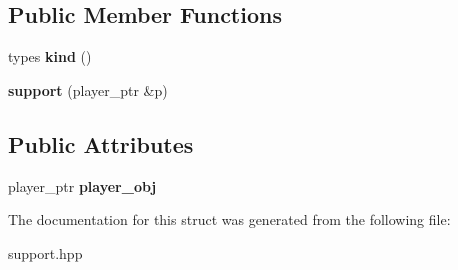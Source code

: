 \subsection*{Public Member Functions}
\begin{DoxyCompactItemize}
\item 
\mbox{\label{structmods_1_1classes_1_1support_a4921613c11bb1c34e6cae390d1a0c19a}} 
types {\bfseries kind} ()
\item 
\mbox{\label{structmods_1_1classes_1_1support_a57fa35285a16c95248ca73fff965002c}} 
{\bfseries support} (player\+\_\+ptr \&p)
\end{DoxyCompactItemize}
\subsection*{Public Attributes}
\begin{DoxyCompactItemize}
\item 
\mbox{\label{structmods_1_1classes_1_1support_a98a55db6d438852350b6cd85481414d2}} 
player\+\_\+ptr {\bfseries player\+\_\+obj}
\end{DoxyCompactItemize}


The documentation for this struct was generated from the following file\+:\begin{DoxyCompactItemize}
\item 
support.\+hpp\end{DoxyCompactItemize}
